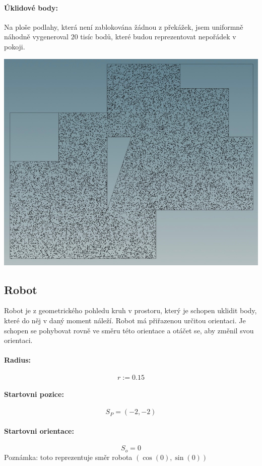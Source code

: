 \documentclass[11pt]{article}
\begin{document}
\paragraph{Úklidové body:} Na ploše podlahy, která není zablokována žádnou z překážek, jsem uniformně náhodně vygeneroval $20$ tisíc bodů, které budou reprezentovat nepořádek v pokoji.

\begin{center}
	\includegraphics[scale=0.37]{Images/RoomDebris.jpeg}
\end{center}

\subsection{Robot}
Robot je z geometrického pohledu kruh v prostoru, který je schopen uklidit body, které do něj v daný moment náleží. Robot má přiřazenou určitou orientaci. Je schopen se pohybovat rovně ve směru této orientace a otáčet se, aby změnil svou orientaci.
\paragraph{Radius:}
$$
r:=0.15
$$
\paragraph{Startovni pozice:}
$$
S_P=(-2,-2)
$$
\paragraph{Startovni orientace:}
$$
S_o=0
$$
Poznámka: toto reprezentuje směr robota  $(\cos(0),\sin(0))$
\end{document}
